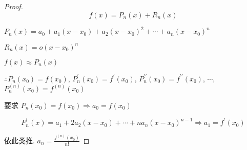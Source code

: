 \begin{proof}
    $$ f(x)=P_{n}(x)+R_{n}(x) $$
    
    $ P_{n}(x)=a_{0}+a_{1}\left(x-x_{0}\right)+a_{2}\left(x-x_{0}\right)^{2}+\cdots+a_{n}\left(x-x_{0}\right)^{n}  $

    $ R_{n}(x)=o\left(x-x_{0}\right)^{n} $

    $ f(x) \approx P_{n}(x) $

    $\therefore  P_{n}\left(x_{0}\right)=f\left(x_{0}\right) $,
    $ P_{n}^{\prime}\left(x_{0}\right)=f^{\prime}\left(x_{0}\right) $,
    $ P_{n}^{\prime \prime}\left(x_{0}\right)=f^{\prime \prime}\left(x_{0}\right) $,
    $ \cdots  $,
    $ P_{n}^{(n)}\left(x_{0}\right)=f^{(n)}\left(x_{0}\right) $

    要求 $ P_{n}\left(x_{0}\right)=f\left(x_{0}\right) \Rightarrow  a_{0}=f\left(x_{0}\right)  $

    $$ P_{n}^{\prime}(x)=a_{1}+2 a_{2}\left(x-x_{0}\right)+\cdots+n a_{n}\left(x-x_{0}\right)^{n-1} \Rightarrow  a_{1}=f^{\prime}\left(x_{0}\right)  $$

    依此类推. $a_{n}=\frac{f^{(n)}\left(x_{0}\right)}{n !} $
\end{proof}